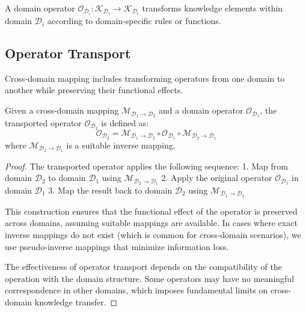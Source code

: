 \begin{definition}
A domain operator $\mathcal{O}_{\mathcal{D}_i}: \mathcal{K}_{\mathcal{D}_i} \rightarrow \mathcal{K}_{\mathcal{D}_i}$ transforms knowledge elements within domain $\mathcal{D}_i$ according to domain-specific rules or functions.
\end{definition}

\subsection{Operator Transport}

Cross-domain mapping includes transforming operators from one domain to another while preserving their functional effects.

\begin{theorem}
Given a cross-domain mapping $\mathcal{M}_{\mathcal{D}_1 \rightarrow \mathcal{D}_2}$ and a domain operator $\mathcal{O}_{\mathcal{D}_1}$, the transported operator $\mathcal{O}_{\mathcal{D}_2}$ is defined as:
\begin{equation}
\mathcal{O}_{\mathcal{D}_2} = \mathcal{M}_{\mathcal{D}_1 \rightarrow \mathcal{D}_2} \circ \mathcal{O}_{\mathcal{D}_1} \circ \mathcal{M}_{\mathcal{D}_2 \rightarrow \mathcal{D}_1}
\end{equation}
where $\mathcal{M}_{\mathcal{D}_2 \rightarrow \mathcal{D}_1}$ is a suitable inverse mapping.
\end{theorem}

\begin{proof}
The transported operator applies the following sequence:
1. Map from domain $\mathcal{D}_2$ to domain $\mathcal{D}_1$ using $\mathcal{M}_{\mathcal{D}_2 \rightarrow \mathcal{D}_1}$
2. Apply the original operator $\mathcal{O}_{\mathcal{D}_1}$ in domain $\mathcal{D}_1$
3. Map the result back to domain $\mathcal{D}_2$ using $\mathcal{M}_{\mathcal{D}_1 \rightarrow \mathcal{D}_2}$

This construction ensures that the functional effect of the operator is preserved across domains, assuming suitable mappings are available. In cases where exact inverse mappings do not exist (which is common for cross-domain scenarios), we use pseudo-inverse mappings that minimize information loss.

The effectiveness of operator transport depends on the compatibility of the operation with the domain structure. Some operators may have no meaningful correspondence in other domains, which imposes fundamental limits on cross-domain knowledge transfer.
\end{proof}

